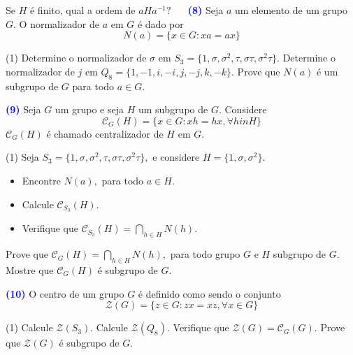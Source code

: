 \documentclass[12pt, a4paper]{article}
\newcommand{\negrito}[1]{\mbox{\boldmath{$#1$}}}
\begin{document}
Se $H$ é finito, qual a ordem de $aHa^{-1}?$
\textcolor{white}{Oi}\newline\newline
\textcolor{blue}{\bf(8)}\label{16} Seja $a$ um elemento de um grupo $G.$ O normalizador de $a$ em $G$ é dado por
\[
N(a) = \{ x \in G : xa = ax \}
\]
\begin{tasks}[counter-format={(tsk[a])},label-width=3.6ex, label-format = {\bfseries}, column-sep = {0pt}](1)
\task[\textcolor{Floresta}{$\negrito{(a)} $}] Determine o normalizador de $\sigma$ em $S_3 = \{1, \sigma, \sigma^2, \tau, \sigma \tau, \sigma^2 \tau \}.$
\task[\textcolor{Floresta}{$\negrito{(b)} $}] Determine o normalizador de $j$ em $Q_8 = \{1, -1, i, -i, j, -j, k,-k \}.$
\task[\textcolor{Floresta}{$\negrito{(c)} $}] Prove que $N(a)$ é um subgrupo de $G$ para todo $a \in G.$
\end{tasks}
\textcolor{blue}{\bf(9)}\label{17} Seja $G$ um grupo e seja $H$ um subgrupo de $G.$ Considere
\[
\mathcal{C}_G(H) = \{x \in G : xh = hx, \forall h in H \}
\]
$\mathcal{C}_G(H)$ é chamado centralizador de $H$ em $G.$
\begin{tasks}[counter-format={(tsk[a])},label-width=3.6ex, label-format = {\bfseries}, column-sep = {0pt}](1)
\task[\textcolor{Floresta}{$\negrito{(a)} $}] Seja $S_3 = \{1, \sigma, \sigma^2, \tau, \sigma \tau, \sigma^2 \tau \},$ e considere $H = \{1, \sigma, \sigma^2 \}.$ 
\begin{itemize}
\item Encontre $N(a),$ para todo $a \in H.$
\item Calcule $\mathcal{C}_{S_3}(H).$
\item Verifique que $\mathcal{C}_{S_3}(H) = \bigcap\limits_{h \in H} N(h).$
\end{itemize}
\task[\textcolor{Floresta}{$\negrito{(b)} $}] Prove que $\mathcal{C}_{G}(H) = \bigcap\limits_{h \in H} N(h),$ para todo grupo $G$ e $H$ subgrupo de $G.$
\task[\textcolor{Floresta}{$\negrito{(c)} $}] Mostre que $\mathcal{C}_G(H)$ é subgrupo de $G.$
\end{tasks}
\textcolor{blue}{\bf(10)}\label{18} O centro de um grupo $G$ é definido como sendo o conjunto
\[
\mathcal{Z}(G) = \{ z \in G : zx = xz, \forall x \in G \}
\]
\begin{tasks}[counter-format={(tsk[a])},label-width=3.6ex, label-format = {\bfseries}, column-sep = {0pt}](1)
\task[\textcolor{Floresta}{$\negrito{(a)} $}] Calcule $\mathcal{Z}(S_3).$
\task[\textcolor{Floresta}{$\negrito{(b)} $}] Calcule $\mathcal{Z}(Q_8).$
\task[\textcolor{Floresta}{$\negrito{(c)} $}] Verifique que $\mathcal{Z}(G) = \mathcal{C}_G(G).$
\task[\textcolor{Floresta}{$\negrito{(d)} $}] Prove que $\mathcal{Z}(G)$ é subgrupo de $G.$
\end{tasks}
\end{document}
